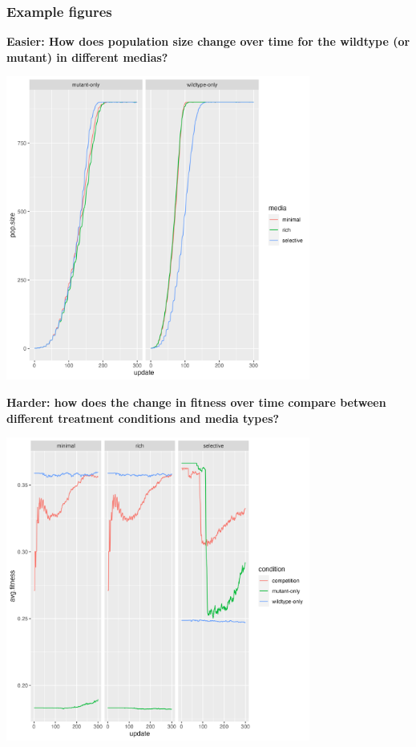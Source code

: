 \documentclass[
  letterpaper,
  DIV=11,
  numbers=noendperiod]{scrreprt}
\begin{document}
\begin{tcolorbox}
\hypertarget{example-figures}{%
\subsubsection{Example figures}\label{example-figures}}

\textbf{Easier: How does population size change over time for the
wildtype (or mutant) in different medias?}

\includegraphics[width=0.75\textwidth,height=\textheight]{scripts/04_projects/project-day-2_files/figs/avida-easy.png}

\textbf{Harder: how does the change in fitness over time compare between
different treatment conditions and media types?}

\includegraphics[width=0.75\textwidth,height=\textheight]{scripts/04_projects/project-day-2_files/figs/avida-hard.png}

\end{tcolorbox}
\end{document}
